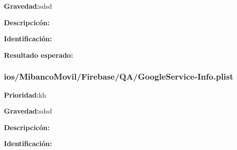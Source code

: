 \documentclass{article}
\begin{document}
        \endgroup

        \begingroup
        \noindent
        \leftskip 35pt 
        \rightskip 0pt 
        \vspace{10pt}
        \textbf{Gravedad:}sdsd

        \endgroup
            
        \begingroup
        \noindent
        \leftskip 35pt 
        \rightskip 0pt 
        \vspace{10pt}
        \textbf{Descripcicón:}
    
        \endgroup

        \begingroup
        \noindent
        \leftskip 35pt 
        \rightskip 0pt 
        \vspace{10pt}
        \textbf{Identificación:}
        
        \endgroup

        \begingroup
        \noindent
        \leftskip 35pt 
        \rightskip 0pt 
        \vspace{10pt}
        \textbf{Resultado esperado:}
    
        \endgroup
        \subsubsection{ios/MibancoMovil/Firebase/QA/GoogleService-Info.plist}
        \begingroup
            \noindent
            \leftskip 35pt 
            \rightskip 0pt 
            \vspace{10pt}
            \textbf{Prioridad:}kh

            \endgroup

            \begingroup
            \noindent
            \leftskip 35pt 
            \rightskip 0pt 
            \vspace{10pt}
            \textbf{Gravedad:}sdsd

            \endgroup
                
            \begingroup
            \noindent
            \leftskip 35pt 
            \rightskip 0pt 
            \vspace{10pt}
            \textbf{Descripcicón:}
        
            \endgroup

            \begingroup
            \noindent
            \leftskip 35pt 
            \rightskip 0pt 
            \vspace{10pt}
            \textbf{Identificación:}
            
\end{document}
